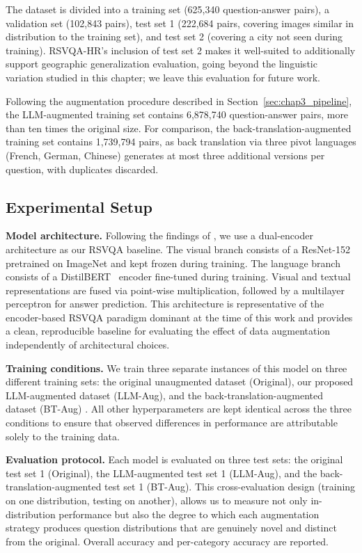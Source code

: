 The dataset is divided into a training set
(625,340 question-answer pairs), a validation set
(102,843 pairs), test set 1 (222,684 pairs, covering
images similar in distribution to the training set),
and test set 2 (covering a city not seen during
training). RSVQA-HR's inclusion of test set 2 makes
it well-suited to additionally support geographic
generalization evaluation, going beyond the linguistic
variation studied in this chapter; we leave this
evaluation for future work.
 
Following the augmentation procedure described in
Section~\ref{sec:chap3_pipeline}, the LLM-augmented
training set contains 6,878,740 question-answer pairs, 
more than ten times the original size. For
comparison, the back-translation-augmented training
set contains 1,739,794 pairs, as back translation
via three pivot languages (French, German, Chinese)
generates at most three additional versions per
question, with duplicates discarded.
 
\subsection{Experimental Setup}
\label{sec:chap3_setup}
 
\textbf{Model architecture.} Following the findings
of \cite{chappuis2025langbias}, we use a dual-encoder
architecture as our RSVQA baseline. The visual branch
consists of a ResNet-152~\cite{he2016resnet} pretrained
on ImageNet and kept frozen during training. The
language branch consists of a
DistilBERT~\cite{sanh2019distilbert} encoder
fine-tuned during training. Visual and textual
representations are fused via point-wise
multiplication, followed by a multilayer perceptron
for answer prediction. This architecture is
representative of the encoder-based RSVQA paradigm
dominant at the time of this work and provides a
clean, reproducible baseline for evaluating the
effect of data augmentation independently of
architectural choices.
 
\textbf{Training conditions.} We train three separate
instances of this model on three different training
sets: the original unaugmented dataset (Original), our proposed LLM-augmented dataset (LLM-Aug), and the
back-translation-augmented dataset (BT-Aug) \cite{yuan2023multilingual}. All
other hyperparameters are kept identical across
the three conditions to ensure that observed
differences in performance are attributable solely
to the training data.
 
\textbf{Evaluation protocol.} Each model is evaluated
on three test sets: the original test set 1
(Original), the LLM-augmented test set 1 (LLM-Aug),
and the back-translation-augmented test set 1
(BT-Aug). This cross-evaluation design (training
on one distribution, testing on another), allows
us to measure not only in-distribution performance
but also the degree to which each augmentation
strategy produces question distributions that are
genuinely novel and distinct from the original.
Overall accuracy and per-category accuracy are
reported.
 
